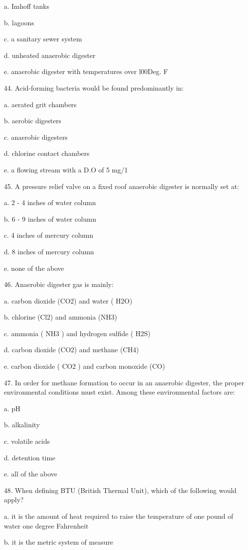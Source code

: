 \documentclass{article}
\begin{document}
a. Imhoff tanks 

b. lagoons 

c. a sanitary sewer system 

d. unheated anaerobic digester 

e. anaerobic digester with temperatures over l00Deg. F 


44. Acid-forming bacteria would be found predominantly in: 

a. aerated grit chambers 

b. aerobic digesters 

c. anaerobic digesters 

d. chlorine contact chambers 

e. a flowing stream with a D.O of 5 mg/1 


45. A pressure relief valve on a fixed roof anaerobic digester is normally set at: 

a. 2 - 4 inches of water column 

b. 6 - 9 inches of water column 

c. 4 inches of mercury column 

d. 8 inches of mercury column 

e. none of the above 


46. Anaerobic digester gas is mainly: 

a. carbon dioxide (CO2) and water ( H2O) 

b. chlorine (Cl2) and ammonia (NH3) 

c. ammonia ( NH3 ) and hydrogen sulfide ( H2S) 

d. carbon dioxide (CO2) and methane (CH4) 

e. carbon dioxide ( CO2 ) and carbon monoxide (CO) 


47. In order for methane formation to occur in an anaerobic digester, the proper environmental conditions must exist. Among these environmental factors are: 

a. pH 

b. alkalinity 

c. volatile acids 

d. detention time 

e. all of the above 


48. When defining BTU (British Thermal Unit), which of the following would apply? 

a. it is the amount of heat required to raise the temperature of one pound of water one degree Fahrenheit 

b. it is the metric system of measure 
\end{document}
